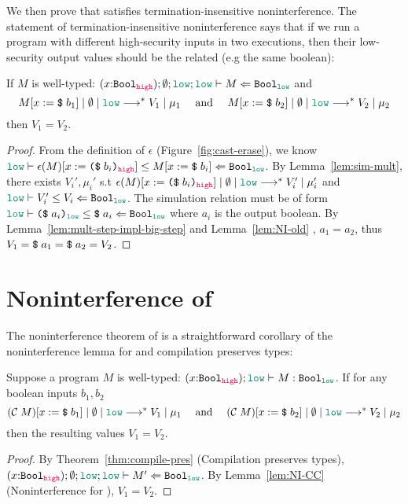 We then prove that \CC satisfies termination-insensitive noninterference. The
statement of termination-insensitive noninterference says that if we run a
program with different high-security inputs in two executions, then their
low-security output values should be the related (e.g the same boolean):

\begin{lemma}
\label{lem:NI-CC}
If $M$ is well-typed:
$(x{:}\Bool_{\high}) ; \emptyset ; \low ; \low \vdash M \Leftarrow \Bool_{\low}$
and
{\normalfont
\begin{equation*}
\reducemult{M [ x := \ccconst{b_1}]}{\emptyset}{\low}{V_1}{\mu_1}
\quad\text{ and }\quad
\reducemult{M [ x := \ccconst{b_2}]}{\emptyset}{\low}{V_2}{\mu_2}
\end{equation*}}
then $V_1 = V_2$.
\end{lemma}
\begin{proof}
From the definition of $\epsilon$ (Figure~\ref{fig:cast-erase}), we know
$\simrel{\low}{\epsilon(M)[x:= \dynconst{b_i}{\high}]}{M [ x :=
    \ccconst{b_i}]}{\Bool_{\low}}$. By Lemma~\ref{lem:sim-mult}, there exists
$V_i', \mu_i'$ s.t $\reducemult{\epsilon(M)[x:=
    \dynconst{b_i}{\high}]}{\emptyset}{\low}{V_i'}{\mu_i'}$ and
$\simrel{\low}{V_i'}{V_i}{\Bool_{\low}}$. The simulation relation must be of
form $\simrel{\low}{\dynconst{a_i}{\low}}{\ccconst{a_i}}{\Bool_{\low}}$ where
$a_i$ is the output boolean. By Lemma~\ref{lem:mult-step-impl-big-step} and
Lemma~\ref{lem:NI-old} , $a_1 = a_2$, thus $V_1 = \text{\texttt{{\$}}}\;{a_1} = \text{\texttt{{\$}}}\;{a_2}
= V_2$.
\end{proof}

\section{Noninterference of \Surface}
\label{sec:NI}

The noninterference theorem of \Surface is a straightforward corollary of the
noninterference lemma for \CC and compilation preserves types:

\begin{theorem}
\label{thm:NI-Surface}
Suppose a \Surface program $M$ is well-typed:
$(x{:}\Bool_{\high}) ; \low \vdash M : \Bool_{\low}$.
If for any boolean inputs $b_1,b_2$
{\normalfont
\begin{equation*}
\reducemult{(\compile{M}) [ x := \ccconst{b_1}]}{\emptyset}{\low}{V_1}{\mu_1}
\quad\text{ and }\quad
\reducemult{(\compile{M}) [ x := \ccconst{b_2}]}{\emptyset}{\low}{V_2}{\mu_2}
\end{equation*}}
then the resulting values $V_1 = V_2$.
\end{theorem}
\begin{proof}
By Theorem~\ref{thm:compile-pres} (Compilation preserves types),
$(x{:}\Bool_{\high}) ; \emptyset ; \low ; \low \vdash M' \Leftarrow \Bool_{\low}$.
By Lemma~\ref{lem:NI-CC} (Noninterference for \CC), $V_1 = V_2$.
\end{proof}
